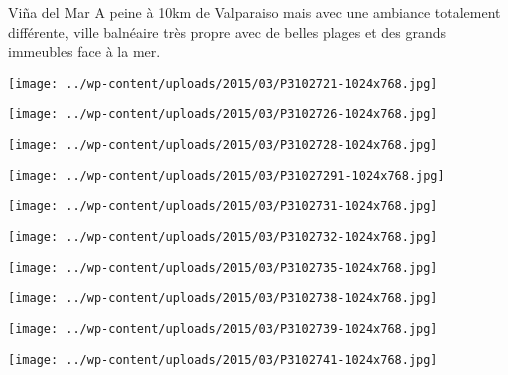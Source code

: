  \newline
 Viña del Mar \newline
 A peine à 10km de Valparaiso mais avec une ambiance totalement différente, ville balnéaire très propre avec de belles plages et des grands immeubles face à la mer. \newline
 \newline
\centerline{\texttt{[image: ../wp-content/uploads/2015/03/P3102721-1024x768.jpg]} } 
 \newline
\centerline{\texttt{[image: ../wp-content/uploads/2015/03/P3102726-1024x768.jpg]} } 
 \newline
\centerline{\texttt{[image: ../wp-content/uploads/2015/03/P3102728-1024x768.jpg]} } 
 \newline
\centerline{\texttt{[image: ../wp-content/uploads/2015/03/P31027291-1024x768.jpg]} } 
 \newline
\centerline{\texttt{[image: ../wp-content/uploads/2015/03/P3102731-1024x768.jpg]} } 
 \newline
\centerline{\texttt{[image: ../wp-content/uploads/2015/03/P3102732-1024x768.jpg]} } 
 \newline
\centerline{\texttt{[image: ../wp-content/uploads/2015/03/P3102735-1024x768.jpg]} } 
 \newline
\centerline{\texttt{[image: ../wp-content/uploads/2015/03/P3102738-1024x768.jpg]} } 
 \newline
\centerline{\texttt{[image: ../wp-content/uploads/2015/03/P3102739-1024x768.jpg]} } 
 \newline
\centerline{\texttt{[image: ../wp-content/uploads/2015/03/P3102741-1024x768.jpg]} } 
 \newline

\newpage
 
